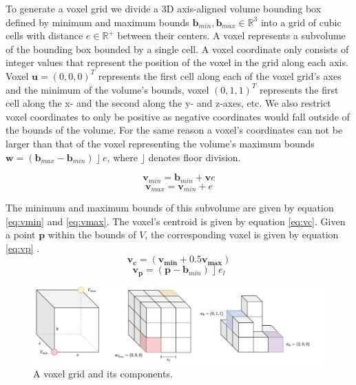 To generate a voxel grid we divide a 3D axis-aligned volume bounding box  defined by minimum and maximum bounds \(\mathbf{b}_{min}, \mathbf{b}_{max} \in \mathbb{R}^{3}\) into a grid of cubic cells with distance \(e \in \mathbb{R}^+\) between their centers. A voxel represents a subvolume of the bounding box bounded by a single cell. A voxel coordinate only consists of integer values that represent the position of the voxel in the grid along each axis. Voxel \(\boldsymbol{u} = (0,0,0)^T\) represents the first cell along each of the voxel grid's axes and the minimum of the volume's bounds, voxel \((0,1,1)^T\) represents the first cell along the x- and the second along the y- and z-axes, etc. We also restrict voxel coordinates to only be positive as negative coordinates would fall outside of the bounds of the volume. For the same reason a voxel's coordinates can not be larger than that of the voxel representing the volume's maximum bounds \(\boldsymbol{w} = (\mathbf{b}_{max} - \mathbf{b}_{min})\ \rfloor \ e\), where \(\rfloor\) denotes floor division. 


\begin{equation}
    \label{eq:vmin}
\boldsymbol{v}_{min} = \mathbf{b}_{min} + \boldsymbol{v}e
\end{equation}
\begin{equation}
    \label{eq:vmax}
\boldsymbol{v}_{max} = \boldsymbol{v}_{min}+e
\end{equation}

The minimum and maximum bounds of this subvolume are given by equation \ref{eq:vmin} and \ref{eq:vmax}. The voxel's centroid is given by equation \ref{eq:vc}. Given a point \(\boldsymbol{p}\) within the bounds of \(V\), the corresponding voxel is given by equation \ref{eq:vp} . 
\begin{equation}
    \label{eq:vc}
    \boldsymbol{v_c} = (\boldsymbol{v_{min}} + 0.5\boldsymbol{v_{max}})
\end{equation}
\begin{equation}
    \label{eq:vp}
    \boldsymbol{v_p} = (\boldsymbol{p} - \mathbf{b}_{min})\ \rfloor\ e_l
\end{equation}


\begin{figure}[h]
    \centering
    \includegraphics*[width=\textwidth]{./fig/voxel_basics.pdf}
    \caption{A voxel grid and its components.}
    \label{fig:vg_basic}
\end{figure}


